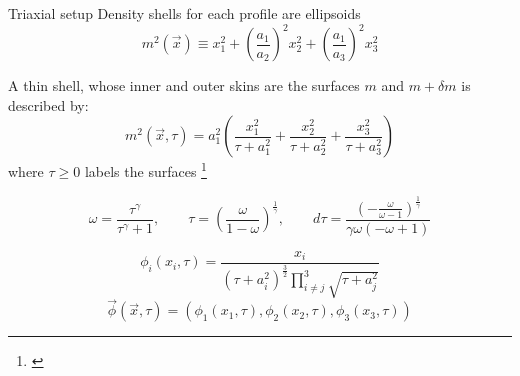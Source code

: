\documentclass{beamer}
\newcommand\blfootnote[1]
{%
	\begingroup
	\renewcommand\thefootnote{}\footnote{#1}%
	\addtocounter{footnote}{-1}%
	\endgroup
}
\newcommand{\fcite}[1]{\blfootnote{\tiny\cite{#1}}}
\begin{document}
\begin{frame}{Triaxial setup}
	Density shells for each profile are ellipsoids
	\begin{equation}
	m^2(\vec{x}) \equiv x_1^2 + \left(\dfrac{a_1}{a_2}\right)^2x_2^2 + \left(\dfrac{a_1}{a_3}\right)^2x_3^2
	\end{equation}
	
	A thin shell, whose inner and outer skins are the surfaces $m$ and $m + \delta m$ is described by:
	\begin{equation}\label{eq: m2}
	m^2(\vec{x}, \tau) = a_1^2\left(\frac{x_1^{2}}{\tau + a_{1}^{2}} + \frac{x_2^{2}}{\tau + a_{2}^{2}} + \frac{x_3^{2}}{\tau + a_{3}^{2}}\right)
	\end{equation}
	where $\tau \geq 0$ labels the surfaces \fcite{binney2011galactic}
\end{frame}

\begin{frame}
	\begin{equation}
		\omega = \dfrac{\tau^\gamma}{\tau^\gamma + 1}, \qquad \tau = \left(\frac{\omega}{1-\omega}\right)^{\frac{1}{\gamma}}, \qquad d\tau = \dfrac{\left(- \frac{\omega}{\omega - 1}\right)^{\frac{1}{\gamma}}}{\gamma \omega \left(- \omega + 1\right)}
	\end{equation}
	
	\begin{equation}
		\phi_i(x_i, \tau) = \dfrac{x_i}{\left(\tau + a_i^2\right)^{\frac{3}{2}} \prod\limits_{i \neq j}^3\sqrt{\tau + a_j^2}}
	\end{equation}
	\begin{equation}
		\vec{\phi}(\vec{x}, \tau) = (\phi_1(x_1, \tau), \phi_2(x_2, \tau), \phi_3(x_3, \tau))
	\end{equation}
\end{frame}
\end{document}
